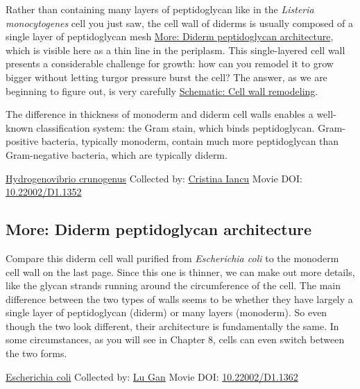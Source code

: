 \documentclass[]{tufte-book}
\begin{document}
Rather than containing many layers of peptidoglycan like in the \emph{Listeria monocytogenes} cell you just saw, the cell wall of diderms is usually composed of a single layer of peptidoglycan mesh \protect\hyperlink{Diderm_peptidoglycan_architecture}{More: Diderm peptidoglycan architecture}, which is visible here as a thin line in the periplasm. This single-layered cell wall presents a considerable challenge for growth: how can you remodel it to grow bigger without letting turgor pressure burst the cell? The answer, as we are beginning to figure out, is very carefully \protect\hyperlink{Cell_wall_remodeling}{Schematic: Cell wall remodeling}.

The difference in thickness of monoderm and diderm cell walls enables a well-known classification system: the Gram stain, which binds peptidoglycan. Gram-positive bacteria, typically monoderm, contain much more peptidoglycan than Gram-negative bacteria, which are typically diderm.



\hypertarget{htmlwidget-4293f5ad31e9178a36f9}{}

\label{fig:2-3}\protect\hyperlink{tree}{Hydrogenovibrio crunogenus} Collected by: \protect\hyperlink{cristina_iancu}{Cristina Iancu} Movie DOI: \href{https://doi.org/10.22002/D1.1352}{10.22002/D1.1352}

\hypertarget{Diderm_peptidoglycan_architecture}{%
\subsection*{More: Diderm peptidoglycan architecture}\label{Diderm_peptidoglycan_architecture}}

Compare this diderm cell wall purified from \emph{Escherichia coli} to the monoderm cell wall on the last page. Since this one is thinner, we can make out more details, like the glycan strands running around the circumference of the cell. The main difference between the two types of walls seems to be whether they have largely a single layer of peptidoglycan (diderm) or many layers (monoderm). So even though the two look different, their architecture is fundamentally the same. In some circumstances, as you will see in Chapter 8, cells can even switch between the two forms.



\hypertarget{htmlwidget-488987d2169b73f2ec82}{}

\label{fig:2-3a}\protect\hyperlink{tree}{Escherichia coli} Collected by: \protect\hyperlink{lu_gan}{Lu Gan} Movie DOI: \href{https://doi.org/10.22002/D1.1362}{10.22002/D1.1362}
\end{document}
